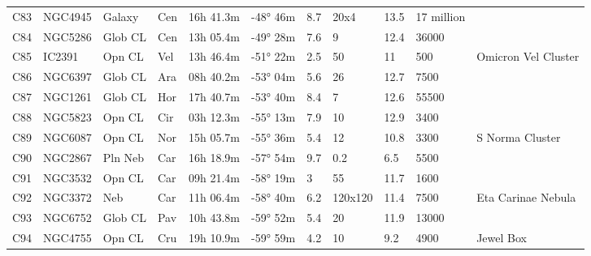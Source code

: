 \begin{table}[h]
\begin{tabular}{@{}lllllllllll@{}}
C83        & NGC4945     & Galaxy     & Cen       & 16h 41.3m & -48° 46m  & 8.7       & 20x4                 & 13.5     & 17 million          &                                 \\
C84        & NGC5286     & Glob CL    & Cen       & 13h 05.4m & -49° 28m  & 7.6       & 9                    & 12.4     & 36000               &                                 \\
C85        & IC2391      & Opn CL     & Vel       & 13h 46.4m & -51° 22m  & 2.5       & 50                   & 11       & 500                 & Omicron Vel Cluster             \\
C86        & NGC6397     & Glob CL    & Ara       & 08h 40.2m & -53° 04m  & 5.6       & 26                   & 12.7     & 7500                &                                 \\
C87        & NGC1261     & Glob CL    & Hor       & 17h 40.7m & -53° 40m  & 8.4       & 7                    & 12.6     & 55500               &                                 \\
C88        & NGC5823     & Opn CL     & Cir       & 03h 12.3m & -55° 13m  & 7.9       & 10                   & 12.9     & 3400                &                                 \\
C89        & NGC6087     & Opn CL     & Nor       & 15h 05.7m & -55° 36m  & 5.4       & 12                   & 10.8     & 3300                & S Norma Cluster                 \\
C90        & NGC2867     & Pln Neb    & Car       & 16h 18.9m & -57° 54m  & 9.7       & 0.2                  & 6.5      & 5500                &                                 \\
C91        & NGC3532     & Opn CL     & Car       & 09h 21.4m & -58° 19m  & 3         & 55                   & 11.7     & 1600                &                                 \\
C92        & NGC3372     & Neb        & Car       & 11h 06.4m & -58° 40m  & 6.2       & 120x120              & 11.4     & 7500                & Eta Carinae Nebula              \\
C93        & NGC6752     & Glob CL    & Pav       & 10h 43.8m & -59° 52m  & 5.4       & 20                   & 11.9     & 13000               &                                 \\
C94        & NGC4755     & Opn CL     & Cru       & 19h 10.9m & -59° 59m  & 4.2       & 10                   & 9.2      & 4900                & Jewel Box                       \\

\end{tabular}
\end{table}
